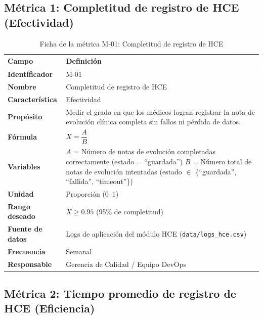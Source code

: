\documentclass[12pt,a4paper]{article}
\begin{document}
\subsection{M\'etrica 1: Completitud de registro de HCE (Efectividad)}

\begin{table}[H]
\centering
\caption{Ficha de la m\'etrica M-01: Completitud de registro de HCE}
\begin{tabularx}{\textwidth}{l X}
\toprule
\textbf{Campo} & \textbf{Definici\'on} \\
\midrule
\textbf{Identificador} & M-01 \\
\textbf{Nombre} & Completitud de registro de HCE \\
\textbf{Caracter\'istica} & Efectividad \\
\textbf{Prop\'osito} & Medir el grado en que los m\'edicos logran registrar la nota de evoluci\'on cl\'inica completa sin fallos ni p\'erdida de datos. \\
\textbf{F\'ormula} & $X = \dfrac{A}{B}$ \\
\textbf{Variables} & $A$ = N\'umero de notas de evoluci\'on completadas correctamente (estado = ``guardada'') \newline $B$ = N\'umero total de notas de evoluci\'on intentadas (estado $\in$ \{``guardada'', ``fallida'', ``timeout''\}) \\
\textbf{Unidad} & Proporci\'on (0--1) \\
\textbf{Rango deseado} & $X \ge 0.95$ (95\% de completitud) \\
\textbf{Fuente de datos} & Logs de aplicaci\'on del m\'odulo HCE (\texttt{data/logs\_hce.csv}) \\
\textbf{Frecuencia} & Semanal \\
\textbf{Responsable} & Gerencia de Calidad / Equipo DevOps \\
\bottomrule
\end{tabularx}
\end{table}

\subsection{M\'etrica 2: Tiempo promedio de registro de HCE (Eficiencia)}
\end{document}
